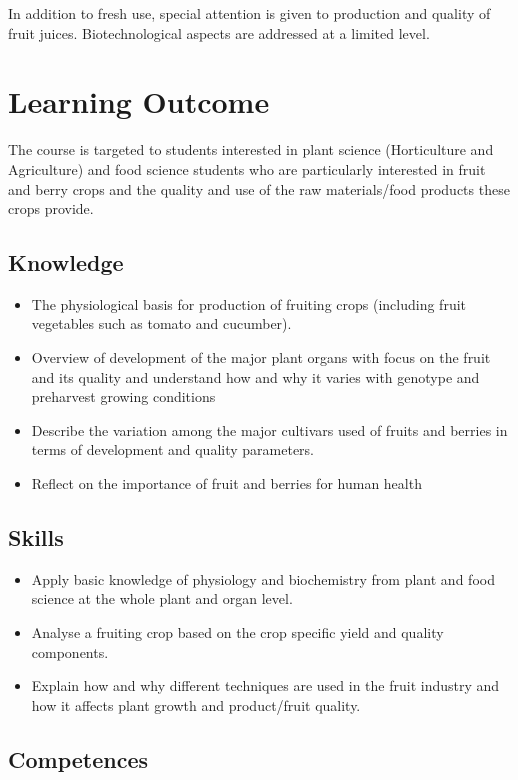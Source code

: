 In addition to fresh use,  special attention is given to production and quality of fruit juices.
Biotechnological aspects are addressed at a limited level.


\section*{Learning Outcome}
The course is targeted to students interested in plant science (Horticulture and Agriculture) and food science students who are particularly interested in fruit and berry crops and the quality and use of the raw materials/food products these crops provide.
\subsection*{Knowledge}

\begin{itemize}
    \item The physiological basis for production of fruiting crops (including fruit vegetables such as tomato and cucumber).
    \item Overview of development of the major plant organs with focus on the fruit and its quality and understand how and why it varies with genotype and preharvest growing conditions
    \item Describe the variation among the major cultivars used of fruits and berries in terms of development and quality parameters.
    \item Reflect on the importance of fruit and berries for human health
\end{itemize}

\subsection*{Skills}

\begin{itemize}
    \item Apply basic knowledge of physiology and biochemistry from plant and food science at the whole plant and organ level.
    \item Analyse a fruiting crop based on the crop specific yield and quality components.
    \item Explain how and why different techniques are used in the fruit industry and how it affects plant growth and product/fruit quality.
\end{itemize}

\subsection*{Competences}

